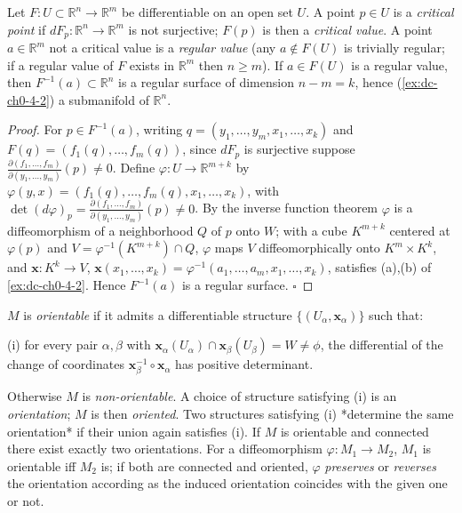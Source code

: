 \begin{example}
  \label{ex:dc-ch0-4-3}
  \notready
  Let $F:U\subset\mathbb{R}^n\to\mathbb{R}^m$ be differentiable on an open set $U$.
  A point $p\in U$ is a \emph{critical point} if $dF_p:\mathbb{R}^n\to\mathbb{R}^m$ is
  not surjective; $F(p)$ is then a \emph{critical value}. A point $a\in\mathbb{R}^m$ not
  a critical value is a \emph{regular value} (any $a\notin F(U)$ is trivially regular; if
  a regular value of $F$ exists in $\mathbb{R}^m$ then $n\ge m$). If $a\in F(U)$ is
  a regular value, then $F^{-1}(a)\subset\mathbb{R}^n$ is a regular surface of
  dimension $n-m=k$, hence (\cref{ex:dc-ch0-4-2}) a submanifold of $\mathbb{R}^n$.
\end{example}
\begin{proof}
  For $p\in F^{-1}(a)$, writing $q=(y_1,\dots,y_m,x_1,\dots,x_k)$ and
  $F(q)=(f_1(q),\dots,f_m(q))$, since $dF_p$ is surjective suppose
  $\frac{\partial(f_1,\dots,f_m)}{\partial(y_1,\dots,y_m)}(p)\neq0$. Define
  $\varphi:U\to\mathbb{R}^{m+k}$ by
  $\varphi(y,x)=(f_1(q),\dots,f_m(q),x_1,\dots,x_k)$, with
  $\det(d\varphi)_p=\frac{\partial(f_1,\dots,f_m)}{\partial(y_1,\dots,y_m)}(p)\neq0$.
  By the inverse function theorem $\varphi$ is a diffeomorphism of a neighborhood
  $Q$ of $p$ onto $W$; with a cube $K^{m+k}$ centered at $\varphi(p)$ and
  $V=\varphi^{-1}(K^{m+k})\cap Q$, $\varphi$ maps $V$ diffeomorphically onto
  $K^m\times K^k$, and $\mathbf{x}:K^k\to V$,
  $\mathbf{x}(x_1,\dots,x_k)=\varphi^{-1}(a_1,\dots,a_m,x_1,\dots,x_k)$, satisfies
  (a),(b) of \cref{ex:dc-ch0-4-2}. Hence $F^{-1}(a)$ is a regular surface. $\square$
\end{proof}

\begin{definition}
  \label{def:dc-ch0-4-4}
  \leanok
  $M$ is \emph{orientable} if it admits a differentiable structure
  $\{(U_\alpha,\mathbf{x}_\alpha)\}$ such that:
  
  (i) for every pair $\alpha,\beta$ with
  $\mathbf{x}_\alpha(U_\alpha)\cap\mathbf{x}_\beta(U_\beta)=W\neq\phi$, the
  differential of the change of coordinates
  $\mathbf{x}_\beta^{-1}\circ\mathbf{x}_\alpha$ has positive determinant.
  
  Otherwise $M$ is \emph{non-orientable}. A choice of structure satisfying (i) is an
  \emph{orientation}; $M$ is then \emph{oriented}. Two structures satisfying (i) *determine
  the same orientation* if their union again satisfies (i). If $M$ is orientable and
  connected there exist exactly two orientations. For a diffeomorphism
  $\varphi:M_1\to M_2$, $M_1$ is orientable iff $M_2$ is; if both are connected and
  oriented, $\varphi$ \emph{preserves} or \emph{reverses} the orientation according as the
  induced orientation coincides with the given one or not.
\end{definition}

